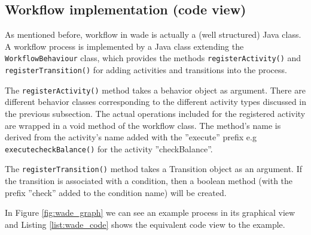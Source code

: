 \subsection{Workflow implementation (code view)}
As mentioned before, workflow in wade is actually a (well structured) Java class. A workflow process is implemented by a Java class extending the \verb|WorkflowBehaviour| class, which provides the methods \verb|registerActivity()| and \verb|registerTransition()| for adding activities and transitions into the process. 

The \verb|registerActivity()| method takes a behavior object as argument. There are different behavior classes corresponding to the different activity types discussed in the previous subsection. The actual operations included for the registered activity are wrapped in a void method of the workflow class. The method's name is derived from the activity's name added with the ''execute'' prefix e.g \verb|executecheckBalance()| for the activity ''checkBalance''.  

The \verb|registerTransition()| method takes a Transition object as an argument. If the transition is associated with a condition, then a boolean method (with the prefix ''check'' added to the condition name) will be created.

In Figure \ref{fig:wade_graph} we can see an example process in its graphical view and Listing \ref{list:wade_code} shows the equivalent code view to the example. 

